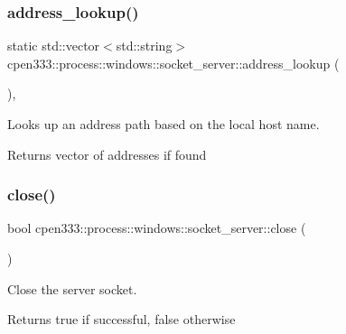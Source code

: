 \subsubsection{\texorpdfstring{address\+\_\+lookup()}{address\_lookup()}}
{\footnotesize\ttfamily static std\+::vector$<$std\+::string$>$ cpen333\+::process\+::windows\+::socket\+\_\+server\+::address\+\_\+lookup (\begin{DoxyParamCaption}{ }\end{DoxyParamCaption})\hspace{0.3cm}{\ttfamily [inline]}, {\ttfamily [static]}}



Looks up an address path based on the local host name. 

\begin{DoxyReturn}{Returns}
vector of addresses if found 
\end{DoxyReturn}
\mbox{\label{classcpen333_1_1process_1_1windows_1_1socket__server_a5eddf38d7b08e27f2299a750f16eae66}} 
\subsubsection{\texorpdfstring{close()}{close()}}
{\footnotesize\ttfamily bool cpen333\+::process\+::windows\+::socket\+\_\+server\+::close (\begin{DoxyParamCaption}{ }\end{DoxyParamCaption})\hspace{0.3cm}{\ttfamily [inline]}}



Close the server socket. 

\begin{DoxyReturn}{Returns}
true if successful, false otherwise 
\end{DoxyReturn}
\mbox{\label{classcpen333_1_1process_1_1windows_1_1socket__server_a440013d371c8c49edcf0e845545d3c1d}} 
